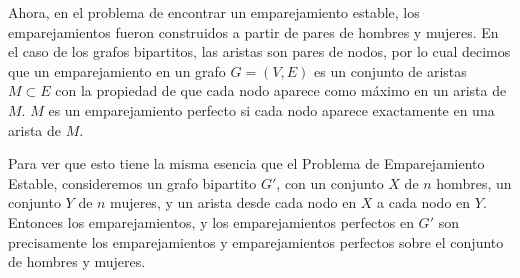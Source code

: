 \documentclass[a4paper, 12pt]{book}
\begin{document}

Ahora, en el problema de encontrar un emparejamiento estable, los emparejamientos fueron construidos a partir de pares de hombres y mujeres. En el caso de los grafos bipartitos, las aristas son pares de nodos, por lo cual decimos que un emparejamiento en un grafo $G = (V,E)$ es un conjunto de aristas $M \subset E$ con la propiedad de que cada nodo aparece como máximo en un arista de $M$. $M$ es un emparejamiento perfecto si cada nodo aparece exactamente en una arista de $M$.

Para ver que esto tiene la misma esencia que el Problema de Emparejamiento Estable, consideremos un grafo bipartito $G'$, con un conjunto $X$ de $n$ hombres, un conjunto $Y$ de $n$ mujeres, y un arista desde cada nodo en $X$ a cada nodo en $Y$. Entonces los emparejamientos, y los emparejamientos perfectos en $G'$ son precisamente los emparejamientos y emparejamientos perfectos sobre el conjunto de hombres y mujeres.
\end{document}
